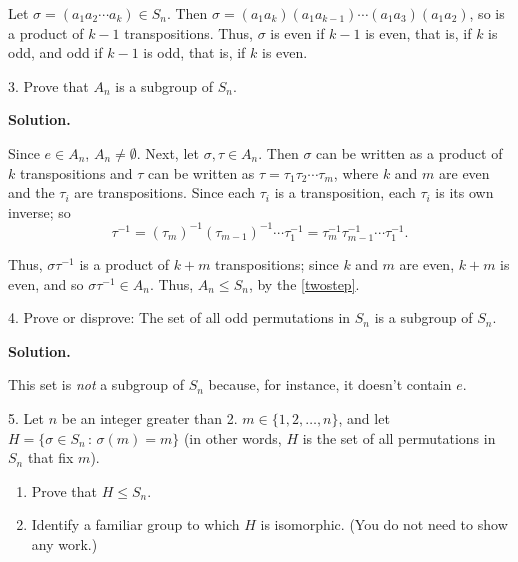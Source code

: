 \documentclass[10pt,]{book}
\theoremstyle{plain}
\theoremstyle{definition}
\theoremstyle{definition}
\theoremstyle{definition}
\theoremstyle{definition}
\numberwithin{equation}{section}
\begin{document}
\begin{exerciselist}
      Let \(\sigma=(a_1a_2\cdots a_k)\in S_n\). Then \(\sigma=(a_1a_k)(a_1a_{k-1})\cdots (a_1a_3)(a_1a_2)\), so is a product of \(k-1\) transpositions. Thus, \(\sigma\) is even if \(k-1\) is even, that is, if \(k\) is odd, and odd if \(k-1\) is odd, that is, if \(k\) is even.
\item[3.]\hypertarget{exercise-43}{}
        Prove that \(A_n\) is a subgroup of \(S_n\).
\par\smallskip
\par\smallskip
\noindent\textbf{Solution.}\hypertarget{solution-43}{}\quad

      Since \(e\in A_n\), \(A_n\neq \emptyset\). Next, let \(\sigma, \tau \in A_n\). Then \(\sigma\) can be written as a product of \(k\) transpositions and \(\tau\) can be written as \(\tau=\tau_1\tau_2\cdots \tau_m\), where \(k\) and \(m\) are even and the \(\tau_i\) are transpositions. Since each \(\tau_i\) is a transposition, each \(\tau_i\) is its own inverse; so
\begin{equation*}

        \tau^{-1}=(\tau_m)^{-1}(\tau_{m-1})^{-1}\cdots \tau_1^{-1}=\tau_m^{-1}\tau_{m-1}^{-1}\cdots \tau_1^{-1}.
      
\end{equation*}

\par

      Thus, \(\sigma \tau^{-1}\) is a product of \(k+m\) transpositions; since \(k\) and \(m\) are even, \(k+m\) is even, and so \(\sigma \tau^{-1}\in A_n\). Thus, \(A_n\leq S_n\), by the \hyperref[twostep]{\ref{twostep}}.
\item[4.]\hypertarget{exercise-44}{}
        Prove or disprove: The set of all odd permutations in \(S_n\) is a subgroup of \(S_n\).
\par\smallskip
\par\smallskip
\noindent\textbf{Solution.}\hypertarget{solution-44}{}\quad

      This set is \emph{not} a subgroup of \(S_n\) because, for instance, it doesn't contain \(e\).
\item[5.]\hypertarget{exercise-45}{}
        Let \(n\) be an integer greater than 2. \(m \in \{1,2,\ldots,n\}\), and let \(H=\{\sigma\in S_n\,:\,\sigma(m)=m\}\) (in other words, \(H\) is the set of all permutations in \(S_n\) that fix \(m\)).
        \leavevmode%
\begin{enumerate}[label=(\alph*)]
\item\hypertarget{li-376}{}
              Prove that \(H\leq S_n\).
\item\hypertarget{li-377}{}
              Identify a familiar group to which \(H\) is isomorphic. (You do not need to show any work.)
\end{enumerate}


\end{exerciselist}
\end{document}
